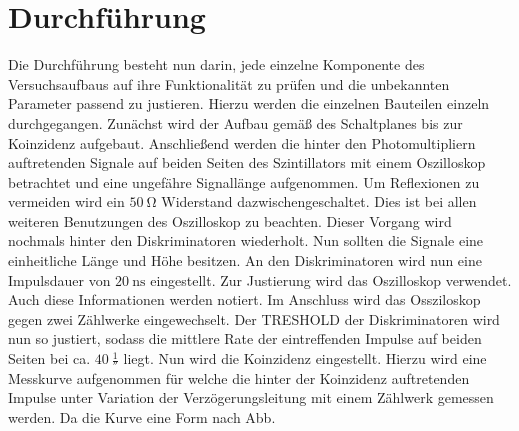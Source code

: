 
\section{Durchführung}
\label{sec:Durchführung}
Die Durchführung besteht nun darin, jede einzelne Komponente des Versuchsaufbaus auf ihre Funktionalität zu prüfen und die unbekannten Parameter passend zu justieren. Hierzu werden die einzelnen Bauteilen einzeln durchgegangen. Zunächst wird der Aufbau gemäß des Schaltplanes bis zur Koinzidenz aufgebaut. Anschließend werden die hinter den Photomultipliern auftretenden Signale auf beiden Seiten des Szintillators mit einem Oszilloskop betrachtet und eine ungefähre Signallänge aufgenommen. Um Reflexionen zu vermeiden wird ein $\SI{50}{\ohm}$ Widerstand dazwischengeschaltet. Dies ist bei allen weiteren Benutzungen des Oszilloskop zu beachten. Dieser Vorgang wird nochmals hinter den Diskriminatoren wiederholt. Nun sollten die Signale eine einheitliche Länge und Höhe besitzen. An den Diskriminatoren wird nun eine Impulsdauer von $\SI{20}{\nano\second}$ eingestellt. Zur Justierung wird das Oszilloskop verwendet. Auch diese Informationen werden notiert. Im Anschluss wird das Ossziloskop gegen zwei Zählwerke eingewechselt. Der TRESHOLD der Diskriminatoren wird nun so justiert, sodass die mittlere Rate der eintreffenden Impulse auf beiden Seiten bei ca. $\SI{40}{\frac{1}{\second}}$ liegt. Nun wird die Koinzidenz eingestellt. Hierzu wird eine Messkurve aufgenommen für welche die hinter der Koinzidenz auftretenden Impulse unter Variation der Verzögerungsleitung mit einem Zählwerk gemessen werden. Da die Kurve eine Form nach Abb. 
